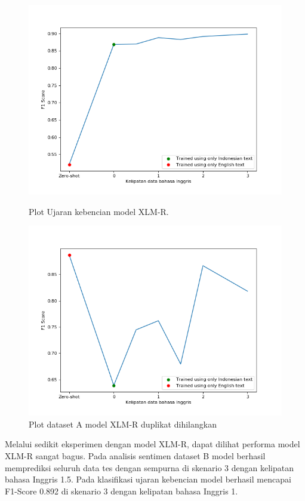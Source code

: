         \begin{figure}[ht]
                \includegraphics[width=\linewidth]{resources/plot-full-toxic-xlmr.png}
                \caption{Plot Ujaran kebencian model XLM-R.}\label{fig:plot_full_toxic_xlmr}
            \endminipage\hfill
                \includegraphics[width=\linewidth]{resources/plot-full-trip-advisor-xlmr-duplicate.png}
                \caption{Plot dataset A model XLM-R duplikat dihilangkan}\label{fig:plot_fuLL_trip_duplicate}
            \endminipage
        \end{figure}
        Melalui sedikit eksperimen dengan model XLM-R, dapat dilihat performa model XLM-R sangat bagus. Pada analisis sentimen dataset B model berhasil memprediksi seluruh data tes dengan sempurna di skenario 3 dengan kelipatan bahasa Inggris 1.5. Pada klasifikasi ujaran kebencian model berhasil mencapai F1-Score 0.892 di skenario 3 dengan kelipatan bahasa Inggris 1. 

